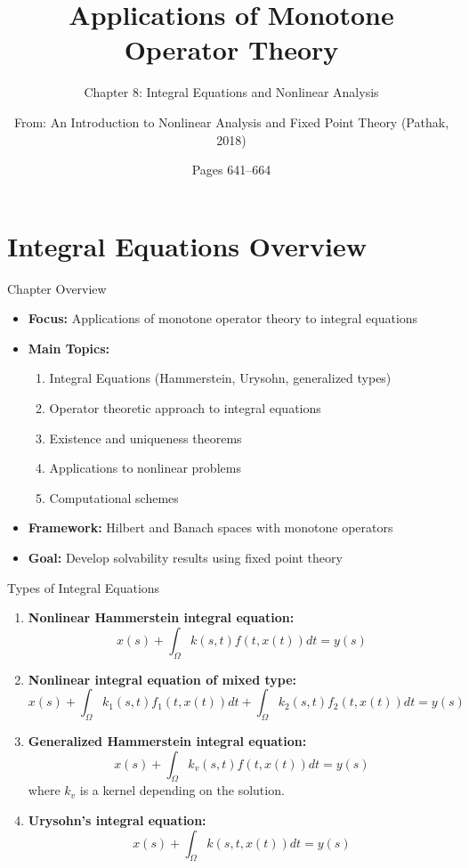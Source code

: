 \documentclass[aspectratio=169,10pt]{beamer}
\title{Applications of Monotone Operator Theory}
\subtitle{Chapter 8: Integral Equations and Nonlinear Analysis}
\author{From: An Introduction to Nonlinear Analysis and Fixed Point Theory (Pathak, 2018)}
\date{Pages 641--664}
\theoremstyle{plain}
\theoremstyle{definition}
\begin{document}
\frame{\titlepage}

\section{Integral Equations Overview}

\begin{frame}{Chapter Overview}
  \begin{itemize}
    \item \textbf{Focus:} Applications of monotone operator theory to integral equations
    \item \textbf{Main Topics:}
    \begin{enumerate}
      \item Integral Equations (Hammerstein, Urysohn, generalized types)
      \item Operator theoretic approach to integral equations
      \item Existence and uniqueness theorems
      \item Applications to nonlinear problems
      \item Computational schemes
    \end{enumerate}
    \item \textbf{Framework:} Hilbert and Banach spaces with monotone operators
    \item \textbf{Goal:} Develop solvability results using fixed point theory
  \end{itemize}
\end{frame}

\begin{frame}{Types of Integral Equations}
  \vspace{0.3cm}
  \begin{enumerate}
    \item \textbf{Nonlinear Hammerstein integral equation:}
      \[
        x(s) + \int_{\Omega} k(s,t) f(t, x(t)) dt = y(s)
      \]

    \item \textbf{Nonlinear integral equation of mixed type:}
      \[
        x(s) + \int_{\Omega} k_1(s,t)f_1(t, x(t)) dt + \int_{\Omega} k_2(s,t)f_2(t, x(t)) dt = y(s)
      \]

    \item \textbf{Generalized Hammerstein integral equation:}
      \[
        x(s) + \int_{\Omega} k_v(s,t) f(t, x(t)) dt = y(s)
      \]
      where $k_v$ is a kernel depending on the solution.

    \item \textbf{Urysohn's integral equation:}
      \[
        x(s) + \int_{\Omega} k(s, t, x(t)) dt = y(s)
      \]
  \end{enumerate}
\end{frame}
\end{document}
